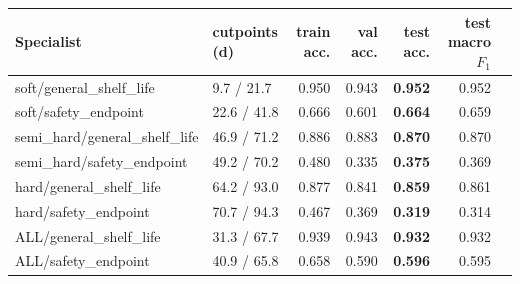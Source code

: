 \begin{tabular}{llrrrrr}
\toprule
Specialist & cutpoints (d) & train acc. & val acc. & test acc. & test macro $F_1$ \\
\midrule
soft/general\_shelf\_life & 9.7 / 21.7 & 0.950 & 0.943 & \textbf{0.952} & 0.952 \\
soft/safety\_endpoint & 22.6 / 41.8 & 0.666 & 0.601 & \textbf{0.664} & 0.659 \\
semi\_hard/general\_shelf\_life & 46.9 / 71.2 & 0.886 & 0.883 & \textbf{0.870} & 0.870 \\
semi\_hard/safety\_endpoint & 49.2 / 70.2 & 0.480 & 0.335 & \textbf{0.375} & 0.369 \\
hard/general\_shelf\_life & 64.2 / 93.0 & 0.877 & 0.841 & \textbf{0.859} & 0.861 \\
hard/safety\_endpoint & 70.7 / 94.3 & 0.467 & 0.369 & \textbf{0.319} & 0.314 \\
ALL/general\_shelf\_life & 31.3 / 67.7 & 0.939 & 0.943 & \textbf{0.932} & 0.932 \\
ALL/safety\_endpoint & 40.9 / 65.8 & 0.658 & 0.590 & \textbf{0.596} & 0.595 \\
\bottomrule
\end{tabular}